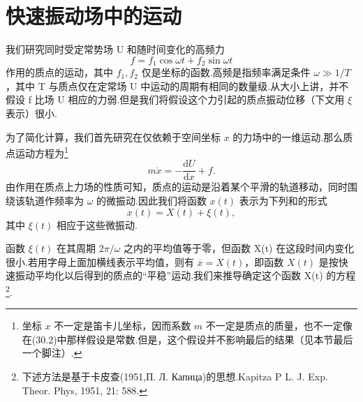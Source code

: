 \section{快速振动场中的运动}

我们研究同时受定常势场 U 和随时间变化的高频力
\begin{equation}
  f=f_1\cos\omega t+f_2\sin\omega t
\end{equation}
作用的质点的运动，其中 $f_1,f_2$ 仅是坐标的函数.高频是指频率满足条件 $\omega\gg 1/T$，其中 T 与质点仅在定常场 U 中运动的周期有相同的数量级.从大小上讲，并不假设 f 比场 U 相应的力弱.但是我们将假设这个力引起的质点振动位移（下文用 $\xi$ 表示）很小.

为了简化计算，我们首先研究在仅依赖于空间坐标 $x$ 的力场中的一维运动.那么质点运动方程为\footnote{坐标 $x$ 不一定是笛卡儿坐标，因而系数 $m$ 不一定是质点的质量，也不一定像在(30.2)中那样假设是常数.但是，这个假设并不影响最后的结果（见本节最后一个脚注）.}
\begin{equation}
  m\ddot{x}=-\frac{\mathrm{d}U}{\mathrm{d}x}+f.
\end{equation}
由作用在质点上力场的性质可知，质点的运动是沿着某个平滑的轨道移动，同时围绕该轨道作频率为 $\omega$ 的微振动.因此我们将函数 $x(t)$ 表示为下列和的形式
\begin{equation}
  x(t)=X(t)+\xi(t),
\end{equation}
其中 $\xi(t)$ 相应于这些微振动.

函数 $\xi(t)$ 在其周期 $2\pi/\omega$ 之内的平均值等于零，但函数 X(t) 在这段时间内变化很小.若用字母上面加横线表示平均值，则有 $\overline{x}=X(t)$，即函数 $X(t)$ 是按快速振动平均化以后得到的质点的“平稳”运动.我们来推导确定这个函数 X(t) 的方程\footnote{下述方法是基于卡皮查(1951,П. Л. Капица)的思想.Kapitza P L. J. Exp. Theor. Phys, 1951, 21: 588.}.

